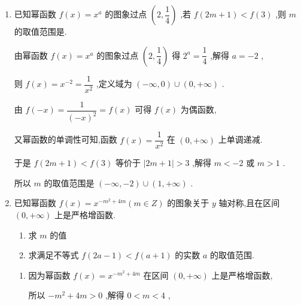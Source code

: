 \begin{enumerate}
\begin{jieda}
        即 $\left( {{3x} - 2}\right) \left( {x + 4}\right)  < 0$ ,解得 $- 4 < x < \dfrac{2}{3}$ ,则不等式的解集为 $\left( {-4,\dfrac{2}{3}}\right)$ .
    \end{jieda}
    \item 已知幂函数 $f\left( x\right)  = {x}^{a}$ 的图象过点 $\left( {2,\dfrac{1}{4}}\right)$ ,若 $f\left( {{2m} + 1}\right)  < f\left( 3\right)$ ,则 $m$ 的取值范围是.
    \begin{jieda}
        由幂函数 $f\left( x\right)  = {x}^{a}$ 的图象过点 $\left( {2,\dfrac{1}{4}}\right)$ 得 ${2}^{a} = \dfrac{1}{4}$ ,解得 $a =  - 2$ ,
        
        则 $f\left( x\right)  = {x}^{-2} = \dfrac{1}{{x}^{2}}$ ,定义域为 $\left( {-\infty ,0}\right)  \cup  \left( {0, + \infty }\right)$ .
        
        由 $f\left( {-x}\right)  = \dfrac{1}{{\left( -x\right) }^{2}} = f\left( x\right)$ 可得 $f\left( x\right)$ 为偶函数,
        
        又幂函数的单调性可知,函数 $f\left( x\right)  = \dfrac{1}{{x}^{2}}$ 在 $\left( {0, + \infty }\right)$ 上单调递减.
        
        于是 $f\left( {{2m} + 1}\right)  < f\left( 3\right)$ 等价于 $\left| {{2m} + 1}\right|  > 3$ ,解得 $m <  - 2$ 或 $m > 1$ .
        
        所以 $m$ 的取值范围是 $\left( {-\infty , - 2}\right)  \cup  \left( {1, + \infty }\right)$ .
    \end{jieda}
    \item 已知幂函数 $f\left( x\right)  = {x}^{-{m}^{2} + {4m}}\left( {m \in  Z}\right)$ 的图象关于 $y$ 轴对称,且在区间 $\left( {0, + \infty }\right)$ 上是严格增函数.
    \begin{enumerate}
        \item 求 $m$ 的值
        \item 求满足不等式 $f\left( {{2a} - 1}\right)  < f\left( {a + 1}\right)$ 的实数 $a$ 的取值范围.
    \end{enumerate}
    \begin{jieda}
        \begin{enumerate}
            \item 因为幂函数 $f\left( x\right)  = {x}^{-{m}^{2} + {4m}}$ 在区间 $\left( {0, + \infty }\right)$ 上是严格增函数,
            
            所以 $- {m}^{2} + {4m} > 0$ ,解得 $0 < m < 4$ ,
            

\end{enumerate}
\end{jieda}
\end{enumerate}
